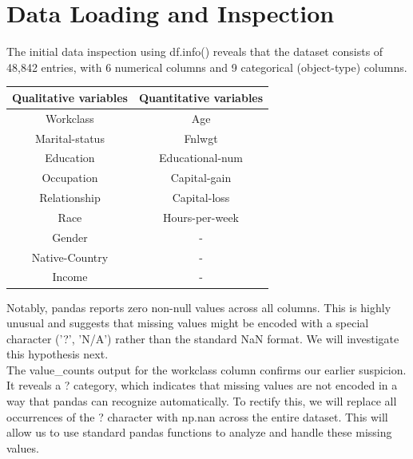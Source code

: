 \thispagestyle{plain}

\chapter{Data Loading and Inspection}
\label{cp:dli}

\vspace{2 \baselineskip}

The initial data inspection using df.info() reveals that the dataset consists of 48,842 entries, with 6 numerical columns and 9 categorical (object-type) columns.


\vspace{1 \baselineskip}
\begin{center}
\begin{tabular}{||c | c||} 
 \hline
 Qualitative variables & Quantitative variables \\ [1 ex] 
 \hline\hline
 Workclass & Age \\ [1ex] 
 \hline
 Marital-status & Fnlwgt \\ [1ex] 
 \hline
 Education & Educational-num \\ [1ex] 
 \hline
 Occupation & Capital-gain  \\ [1ex] 
 \hline
 Relationship & Capital-loss  \\ [1ex] 
 \hline
 Race & Hours-per-week  \\ [1ex] 
 \hline
 Gender & -  \\ [1ex] 
 \hline
 Native-Country & -  \\ [1ex] 
 \hline
 Income & -  \\ [1ex] 
 \hline
\end{tabular}
\end{center}


Notably, pandas reports zero non-null values across all columns. This is highly unusual and suggests that missing values might be encoded with a special character ('?', 'N/A') rather than the standard NaN format. We will investigate this hypothesis next.\\
The value\_counts output for the workclass column confirms our earlier suspicion. It reveals a ? category, which indicates that missing values are not encoded in a way that pandas can recognize automatically. To rectify this, we will replace all occurrences of the ? character with np.nan across the entire dataset. This will allow us to use standard pandas functions to analyze and handle these missing values. \\


